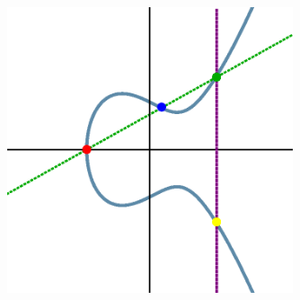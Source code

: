 \begin{frame}
	\begin{figure}[h]
	\centering
	\includegraphics[width=0.75\textwidth]{images/ec_add.eps}
	\end{figure}
\end{frame}



\begin{frame}[plain]
\end{frame}



